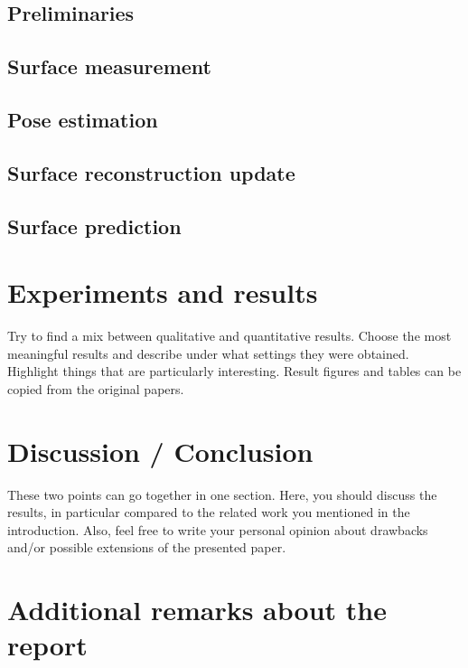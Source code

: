\documentclass[a4paper,12pt]{article}
\begin{document}
\subsection{Preliminaries}


\subsection{Surface measurement}
\subsection{Pose estimation}
\subsection{Surface reconstruction update}
\subsection{Surface prediction}

\section{Experiments and results}

Try to find a mix between qualitative and quantitative results.
Choose the most meaningful results and describe under what settings they were obtained.
Highlight things that are particularly interesting.
Result figures and tables can be copied from the original papers.

\section{Discussion / Conclusion}

These two points can go together in one section.
Here, you should discuss the results, in particular compared to the related work you mentioned in the introduction.
Also, feel free to write your personal opinion about drawbacks and/or possible extensions of the presented paper.

\section*{Additional remarks about the report}
\end{document}
